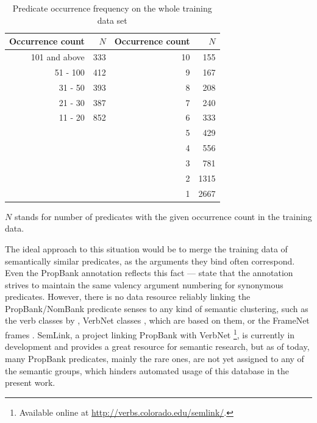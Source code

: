 \documentclass[12pt,notitlepage,a4paper]{report}
\begin{document}
\begin{table}[htb]\footnotesize
\caption{Predicate occurrence frequency on the whole training data set}\label{tab:pred-freq}
\begin{center}
\shorthandoff{-}
\begin{tabular}{|r|r||r|r|}\hline
\bf Occurrence count & \bf $N$ & \bf Occurrence count & \bf $N$ \\\hline
101 and above & 333 & 10 & 155 \\\cline{1-2}
51 - 100 & 412 & 9 & 167 \\
31 - 50 & 393 & 8 & 208 \\\cline{1-2}
21 - 30 & 387 & 7 & 240 \\
11 - 20 & 852 & 6 & 333 \\\cline{1-2}
\multicolumn{2}{c|}{}& 5 & 429 \\
\multicolumn{2}{c|}{}& 4 & 556 \\
\multicolumn{2}{c|}{}& 3 & 781 \\
\multicolumn{2}{c|}{}& 2 & 1315 \\
\multicolumn{2}{c|}{}& 1 & 2667 \\\cline{3-4}
\end{tabular}
\shorthandoff{-}
\end{center}
$N$ stands for number of predicates with the given occurrence count in the training data.
\end{table}

The ideal approach to this situation would be to merge the training data of semantically similar predicates, as the arguments they bind often correspond. Even the PropBank annotation reflects this fact --- \citet{kingsbury02} state that the annotation strives to maintain the same valency argument numbering for synonymous predicates. However, there is no data resource reliably linking the PropBank/NomBank predicate senses to any kind of semantic clustering, such as the verb classes by \citet{levin93}, VerbNet classes \citep{kipper-schuler05}, which are based on them, or the FrameNet frames \citep{baker98,baker02}. SemLink, a project linking PropBank with VerbNet \citep{loper07}\footnote{Available online at \url{http://verbs.colorado.edu/semlink/}.}, is currently in development and provides a great resource for semantic research, but as of today, many PropBank predicates, mainly the rare ones, are not yet assigned to any of the semantic groups, which hinders automated usage of this database in the present work.
\end{document}
